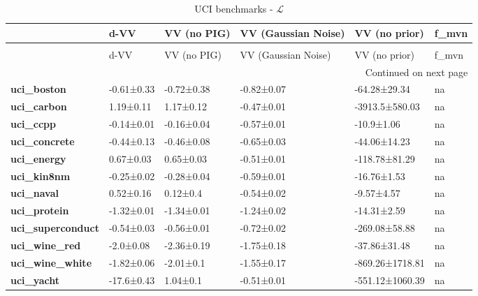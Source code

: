 \begin{longtable}[l]{llllll}
\caption{UCI benchmarks - $\mathcal{L}$}\\
\toprule
{} &        d-VV & VV (no PIG) & VV (Gaussian Noise) &    VV (no prior) & f\_mvn \\
\midrule
\endfirsthead
\caption[]{UCI benchmarks - $\mathcal{L}$} \\
\toprule
{} &        d-VV & VV (no PIG) & VV (Gaussian Noise) &    VV (no prior) & f\_mvn \\
\midrule
\endhead
\midrule
\multicolumn{6}{r}{{Continued on next page}} \\
\midrule
\endfoot

\bottomrule
\endlastfoot
\textbf{uci\_boston      } &  -0.61±0.33 &  -0.72±0.38 &          -0.82±0.07 &     -64.28±29.34 &    na \\
\textbf{uci\_carbon      } &   1.19±0.11 &   1.17±0.12 &          -0.47±0.01 &   -3913.5±580.03 &    na \\
\textbf{uci\_ccpp        } &  -0.14±0.01 &  -0.16±0.04 &          -0.57±0.01 &       -10.9±1.06 &    na \\
\textbf{uci\_concrete    } &  -0.44±0.13 &  -0.46±0.08 &          -0.65±0.03 &     -44.06±14.23 &    na \\
\textbf{uci\_energy      } &   0.67±0.03 &   0.65±0.03 &          -0.51±0.01 &    -118.78±81.29 &    na \\
\textbf{uci\_kin8nm      } &  -0.25±0.02 &  -0.28±0.04 &          -0.59±0.01 &      -16.76±1.53 &    na \\
\textbf{uci\_naval       } &   0.52±0.16 &    0.12±0.4 &          -0.54±0.02 &       -9.57±4.57 &    na \\
\textbf{uci\_protein     } &  -1.32±0.01 &  -1.34±0.01 &          -1.24±0.02 &      -14.31±2.59 &    na \\
\textbf{uci\_superconduct} &  -0.54±0.03 &  -0.56±0.01 &          -0.72±0.02 &    -269.08±58.88 &    na \\
\textbf{uci\_wine\_red    } &   -2.0±0.08 &  -2.36±0.19 &          -1.75±0.18 &     -37.86±31.48 &    na \\
\textbf{uci\_wine\_white  } &  -1.82±0.06 &   -2.01±0.1 &          -1.55±0.17 &  -869.26±1718.81 &    na \\
\textbf{uci\_yacht       } &  -17.6±0.43 &    1.04±0.1 &          -0.51±0.01 &  -551.12±1060.39 &    na \\
\end{longtable}
\addtocounter{table}{-1}
